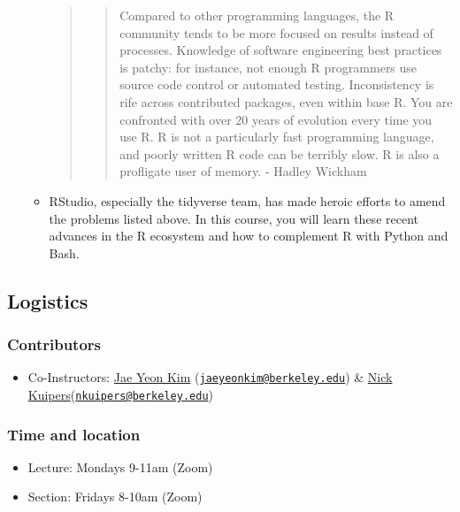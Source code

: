 \documentclass[
]{article}
\providecommand{\tightlist}{%
  \setlength{\itemsep}{0pt}\setlength{\parskip}{0pt}}
\begin{document}
\begin{itemize}
\begin{itemize}
    \begin{quote}
    \begin{quote}
    Compared to other programming languages, the R community tends to be
    more focused on results instead of processes. Knowledge of software
    engineering best practices is patchy: for instance, not enough R
    programmers use source code control or automated testing.
    Inconsistency is rife across contributed packages, even within base
    R. You are confronted with over 20 years of evolution every time you
    use R. R is not a particularly fast programming language, and poorly
    written R code can be terribly slow. R is also a profligate user of
    memory. - Hadley Wickham
    \end{quote}
    \end{quote}
  \item
    RStudio, especially the tidyverse team, has made heroic efforts to
    amend the problems listed above. In this course, you will learn
    these recent advances in the R ecosystem and how to complement R
    with Python and Bash.
  \end{itemize}
\end{itemize}

\hypertarget{logistics}{%
\subsection{Logistics}\label{logistics}}

\hypertarget{contributors}{%
\subsubsection{Contributors}\label{contributors}}

\begin{itemize}
\tightlist
\item
  Co-Instructors: \href{https://jaeyk.github.io/}{Jae Yeon Kim}
  (\href{mailto:jaeyeonkim@berkeley.edu}{\nolinkurl{jaeyeonkim@berkeley.edu}})
  \& \href{https://nicholaskuipers.com}{Nick
  Kuipers}(\href{mailto:nkuipers@berkeley.edu}{\nolinkurl{nkuipers@berkeley.edu}})
\end{itemize}

\hypertarget{time-and-location}{%
\subsubsection{Time and location}\label{time-and-location}}

\begin{itemize}
\item
  Lecture: Mondays 9-11am (Zoom)
\item
  Section: Fridays 8-10am (Zoom)
\end{itemize}
\end{document}
